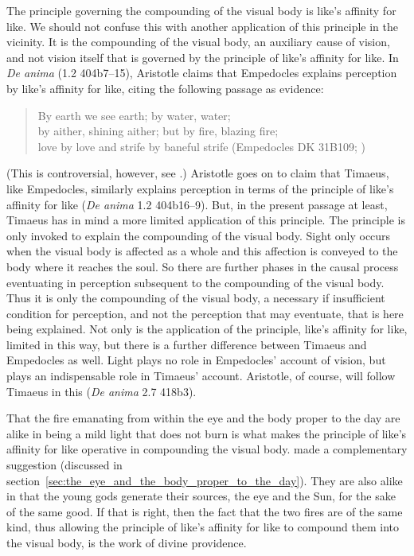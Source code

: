 The principle governing the compounding of the visual body is like's affinity for like. We should not confuse this with another application of this principle in the vicinity. It is the compounding of the visual body, an auxiliary cause of vision, and not vision itself that is governed by the principle of like's affinity for like. In \emph{De anima} (1.2 404b7--15), Aristotle claims that Empedocles explains perception by like's affinity for like, citing the following passage as evidence:
\begin{verse}
	By earth we see earth; by water, water;\\
	by aither, shining aither; but by fire, blazing fire;\\
	love by love and strife by baneful strife (Empedocles DK 31B109; \citealt[221]{Inwood:2001ve})
\end{verse} 
(This is controversial, however, see \citealt{Kamtekar:2009fk}.) Aristotle goes on to claim that Timaeus, like Empedocles, similarly explains perception in terms of the principle of like's affinity for like (\emph{De anima} 1.2 404b16--9). But, in the present passage at least, Timaeus has in mind a more limited application of this principle. The principle is only invoked to explain the compounding of the visual body. Sight only occurs when the visual body is affected as a whole and this affection is conveyed to the body where it reaches the soul. So there are further phases in the causal process eventuating in perception subsequent to the compounding of the visual body. Thus it is only the compounding of the visual body, a necessary if insufficient condition for perception, and not the perception that may eventuate, that is here being explained. Not only is the application of the principle, like's affinity for like, limited in this way, but there is a further difference between Timaeus and Empedocles as well. Light plays no role in Empedocles' account of vision, but plays an indispensable role in Timaeus' account. Aristotle, of course, will follow Timaeus in this (\emph{De anima} 2.7 418b3).

That the fire emanating from within the eye and the body proper to the day are alike in being a mild light that does not burn is what makes the principle of like's affinity for like operative in compounding the visual body. \citet[112]{Johansen:2004dx} made a complementary suggestion (discussed in section~\ref{sec:the_eye_and_the_body_proper_to_the_day}). They are also alike in that the young gods generate their sources, the eye and the Sun, for the sake of the same good. If that is right, then the fact that the two fires are of the same kind, thus allowing the principle of like's affinity for like to compound them into the visual body, is the work of divine providence.

